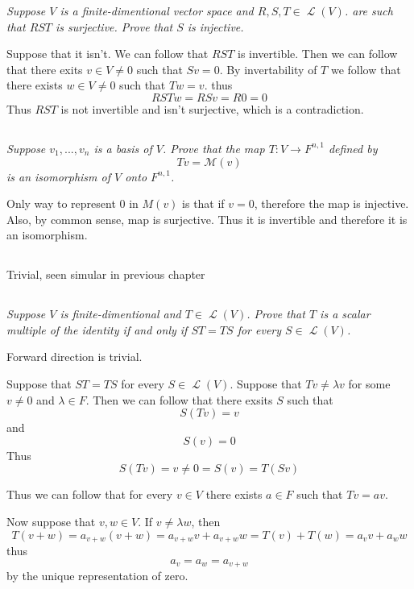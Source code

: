 \documentclass[11pt,oneside,titlepage]{book}
\DeclareMathOperator \map {\mathcal {L}}
\begin{document}
\textit{Suppose $V$ is a finite-dimentional vector space and $R, S, T \in \map(V)$. are
  such that $RST$ is surjective. Prove that $S$ is injective.}

Suppose that it isn't. We can follow that $RST$ is invertible.
Then we can follow that there exits $v \in V \neq 0$ such that
$Sv = 0$. By invertability of $T$ we follow that there exists $w \in V \neq 0$
such that $Tw = v$. thus
$$RSTw = RSv = R0 = 0$$
Thus $RST$ is not invertible and isn't surjective, which is a contradiction.

\subsection{}

\textit{Suppose $v_1, ..., v_n$ is a basis of $V$. Prove that the map $T: V \to F^{n, 1}$
  defined by }
$$Tv = \mathcal M (v)$$
\textit{is an isomorphism of $V$ onto $F^{n, 1}$.}

Only way to represent 0 in $M(v)$ is that if $v = 0$, therefore the map is injective. Also,
by common sense, map is surjective. Thus it is invertible and therefore it is an isomorphism.

\subsection{}

Trivial, seen simular in previous chapter

\subsection{}

\textit{Suppose $V$ is finite-dimentional and $T \in \map(V)$. Prove that $T$ is a scalar
  multiple of the identity if and only if $ST = TS$ for every $S \in \map (V)$.}

Forward direction is trivial.

Suppose that $ST = TS$ for every $S \in \map(V)$. Suppose that $Tv \neq \lambda v$ for some
$v \neq 0$ and $\lambda \in F$. Then we can follow that there exsits $S$ such that
$$S(Tv) = v$$
and
$$S(v) = 0$$
Thus
$$ S (Tv) = v \neq 0 = S(v) = T(Sv)$$

Thus we can follow that for every $v \in V$ there exists $a \in F$ such that $Tv = av$.

Now suppose that $v, w \in V$. If $v \neq \lambda w$, then
$$T(v + w) = a_{v + w}(v + w) = a_{v + w}v + a_{v + w}w = T(v) + T(w) = a_v v + a_w w$$
thus
$$a_v = a_w = a_{v + w}$$
by the unique representation of zero.
\end{document}
